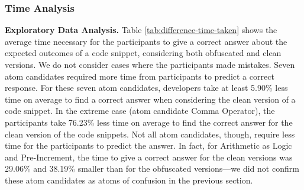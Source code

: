 

\subsubsection{Time Analysis}

{\bf Exploratory Data Analysis.}
Table \ref{tab:difference-time-taken} shows the average time necessary for the participants to give a correct answer about the expected outcomes of a code snippet, considering both obfuscated and clean versions. We do not consider cases where the participants made mistakes. Seven atom candidates required more time from participants to predict a correct response. For these seven atom candidates, developers take at least 5.90\% less time on average to find a correct answer when considering the clean version of a code snippet. In the extreme case (atom candidate Comma Operator), the participants take 76.23\% less
time on average to find the correct answer for the clean version of the code snippets. 
Not all atom candidates, though, require less time for the participants to predict the answer. In fact, for  Arithmetic as Logic and Pre-Increment, the time to give a correct answer for the clean versions was   
29.06\% and 38.19\% smaller than for the obfuscated versions---we did not confirm these atom candidates as atoms of confusion in the previous section.

